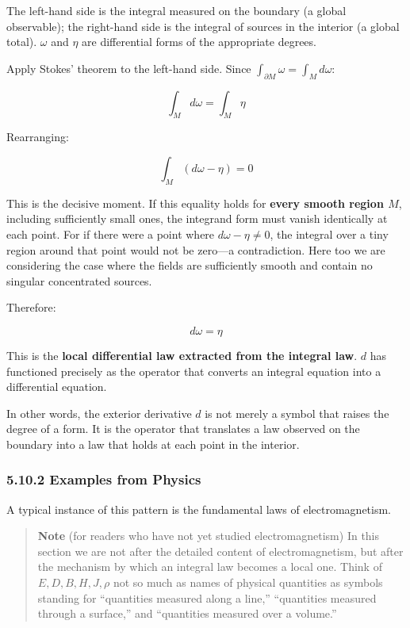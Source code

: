 \documentclass[a4paper,12pt,openany]{book}
\begin{document}
The left-hand side is the integral measured on the boundary (a global
observable); the right-hand side is the integral of sources in the
interior (a global total). \(\omega\) and \(\eta\) are differential
forms of the appropriate degrees.

Apply Stokes' theorem to the left-hand side. Since
\(\int_{\partial M} \omega = \int_M d\omega\):

\[\int_M d\omega = \int_M \eta\]

Rearranging:

\[\int_M (d\omega - \eta) = 0\]

This is the decisive moment. If this equality holds for
\textbf{every smooth region $M$}, including sufficiently small ones, the
integrand form must vanish identically at each point. For if there were
a point where \(d\omega - \eta \neq 0\), the integral over a tiny region
around that point would not be zero—a contradiction. Here too we are
considering the case where the fields are sufficiently smooth and
contain no singular concentrated sources.

Therefore:

\[d\omega = \eta\]

This is the
\textbf{local differential law extracted from the integral law}. \(d\)
has functioned precisely as the operator that converts an integral
equation into a differential equation.

In other words, the exterior derivative \(d\) is not merely a symbol
that raises the degree of a form. It is the operator that translates a
law observed on the boundary into a law that holds at each point in the
interior.

\hypertarget{examples-from-physics}{%
\subsubsection{5.10.2 Examples from
Physics}\label{examples-from-physics}}

A typical instance of this pattern is the fundamental laws of
electromagnetism.

\begin{quote}
\textbf{Note} (for readers who have not yet studied electromagnetism) In
this section we are not after the detailed content of electromagnetism,
but after the mechanism by which an integral law becomes a local one.
Think of \(E,D,B,H,J,\rho\) not so much as names of physical quantities
as symbols standing for ``quantities measured along a line,''
``quantities measured through a surface,'' and ``quantities measured
over a volume.''
\end{quote}
\end{document}
